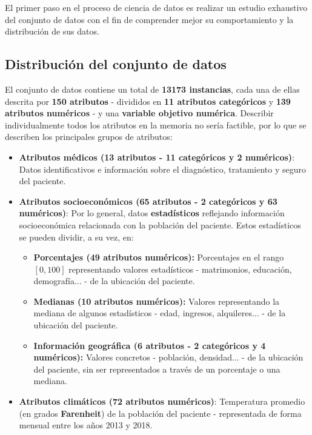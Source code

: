 El primer paso en el proceso de ciencia de datos es realizar un estudio exhaustivo del conjunto de datos con el fin de comprender mejor su comportamiento y la distribución de sus datos.

\subsection{Distribución del conjunto de datos}

El conjunto de datos contiene un total de \textbf{13173 instancias}, cada una de ellas descrita por \textbf{150 atributos} - divididos en \textbf{11 atributos categóricos} y \textbf{139 atributos numéricos} - y una \textbf{variable objetivo numérica}. Describir individualmente todos los atributos en la memoria no sería factible, por lo que se describen los principales grupos de atributos:

\begin{itemize}
	\item \textbf{Atributos médicos (13 atributos - 11 categóricos y 2 numéricos)}: Datos identificativos e información sobre el diagnóstico, tratamiento y seguro del paciente.
	\item \textbf{Atributos socioeconómicos (65 atributos - 2 categóricos y 63 numéricos)}: Por lo general, datos \textbf{estadísticos} reflejando información socioeconómica relacionada con la población del paciente. Estos estadísticos se pueden dividir, a su vez, en:
	\begin{itemize}
		\item \textbf{Porcentajes (49 atributos numéricos):} Porcentajes en el rango $[0, 100]$ representando valores estadísticos - matrimonios, educación, demografía... - de la ubicación del paciente.
		\item \textbf{Medianas (10 atributos numéricos):} Valores representando la mediana de algunos estadísticos - edad, ingresos, alquileres... - de la ubicación del paciente.
		\item \textbf{Información geográfica (6 atributos - 2 categóricos y 4 numéricos):} Valores concretos - población, densidad... - de la ubicación del paciente, sin ser representados a través de un porcentaje o una mediana.
	\end{itemize}
	\item \textbf{Atributos climáticos (72 atributos numéricos)}: Temperatura promedio (en grados \textbf{Farenheit}) de la población del paciente - representada de forma mensual entre los años 2013 y 2018.
\end{itemize}

